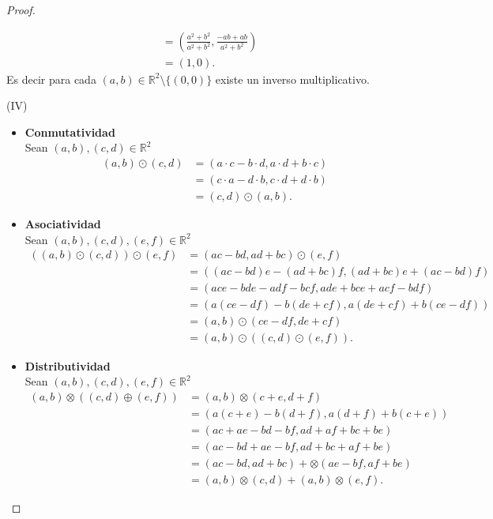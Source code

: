 \documentclass[11pt,letterpaper]{article}
\newcommand{\R}{\mathbb{R}}
\begin{document}
\begin{proof}
\begin{tcolorbox}
\begin{align*}
		&=(\frac{a^2+b^2}{a^2+b^2},\frac{-ab+ab}{a^2+b^2})\\
		&=(1,0).
	\end{align*}
	Es decir para cada $(a,b)\in\R^2\setminus\{(0,0)\}$ existe un inverso multiplicativo.
\end{tcolorbox}
\begin{tcolorbox}
	(IV)\\
	\begin{itemize}
		\item \textbf{Conmutatividad}\\
		Sean $(a,b),(c,d)\in\R^2$
		\begin{align*}
			(a,b)\odot(c,d)&=(a\cdot c-b\cdot d,a\cdot d+b\cdot c)\\
			&=(c\cdot a-d\cdot b,c\cdot d+d\cdot b)\\
			&=(c,d)\odot(a,b).
		\end{align*}
		\item \textbf{Asociatividad}\\
		Sean $(a,b),(c,d),(e,f)\in\R^2$
		\begin{align*}
			((a,b)\odot(c,d))\odot(e,f)&=(ac-bd,ad+bc)\odot(e,f)\\
			&=((ac-bd)e-(ad+bc)f,(ad+bc)e+(ac-bd)f)\\
			&=(ace-bde-adf-bcf,ade+bce+acf-bdf)\\
			&=(a(ce-df)-b(de+cf),a(de+cf)+b(ce-df))\\
			&=(a,b)\odot(ce-df,de+cf)\\
			&=(a,b)\odot((c,d)\odot(e,f)).
		\end{align*}
		\item \textbf{Distributividad}\\
		Sean $(a,b),(c,d),(e,f)\in\R^2$
		\begin{align*}
			(a,b)\otimes((c,d)\oplus(e,f))&=(a,b)\otimes(c+e,d+f)\\
			&=(a(c+e)-b(d+f),a(d+f)+b(c+e))\\
			&=(ac+ae-bd-bf,ad+af+bc+be)\\
			&=(ac-bd+ae-bf,ad+bc+af+be)\\
			&=(ac-bd,ad+bc)+\otimes(ae-bf,af+be)\\
			&=(a,b)\otimes(c,d)+(a,b)\otimes(e,f).
		\end{align*}
	\end{itemize}
\end{tcolorbox}
\end{proof}\,\\
\end{document}
